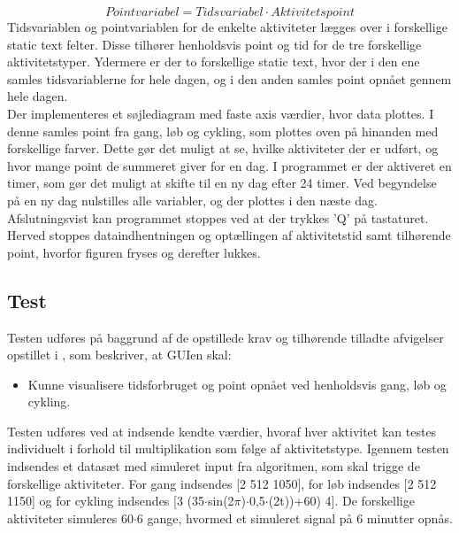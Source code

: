 \begin{equation}
Pointvariabel = Tidsvariabel \cdot Aktivitetspoint
\label{eq:pointvariabel}
\end{equation}
Tidsvariablen og pointvariablen for de enkelte aktiviteter lægges over i forskellige static text felter. Disse tilhører henholdsvis point og tid for de tre forskellige aktivitetstyper. Ydermere er der to forskellige static text, hvor der i den ene samles tidsvariablerne for hele dagen, og i den anden samles point opnået gennem hele dagen. \\
Der implementeres et søjlediagram med faste axis værdier, hvor data plottes. I denne samles point fra gang, løb og cykling, som plottes oven på hinanden med forskellige farver. Dette gør det muligt at se, hvilke aktiviteter der er udført, og hvor mange point de summeret giver for en dag. I programmet er der aktiveret en timer, som gør det muligt at skifte til en ny dag efter 24 timer. Ved begyndelse på en ny dag nulstilles alle variabler, og der plottes i den næste dag.\\ 
Afslutningsvist kan programmet stoppes ved at der trykkes 'Q' på tastaturet. Herved stoppes dataindhentningen og optællingen af aktivitetstid samt tilhørende point, hvorfor figuren fryses og derefter lukkes. 

\subsection{Test}
Testen udføres på baggrund af de opstillede krav og tilhørende tilladte afvigelser opstillet i , som beskriver, at GUIen skal:
\begin{itemize}
	\item Kunne visualisere tidsforbruget og point opnået ved henholdsvis gang, løb og cykling.  
\end{itemize}

Testen udføres ved at indsende kendte værdier, hvoraf hver aktivitet kan testes individuelt i forhold til multiplikation som følge af aktivitetstype.
Igennem testen indsendes et datasæt med simuleret input fra algoritmen, som skal trigge de forskellige aktiviteter. For gang indsendes [2 512 1050], for løb indsendes [2 512 1150] og for cykling indsendes [3 (35$\cdot$sin(2$\pi$)$\cdot$0,5$\cdot$(2t))+60) 4]. De forskellige aktiviteter simuleres 60$\cdot$6 gange, hvormed et simuleret signal på 6 minutter opnås.

